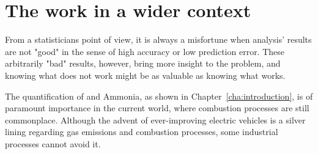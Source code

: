 \section{The work in a wider context}
\label{sec:work-wider-context}

From a statisticians point of view, it is always a misfortune when analysis' results are not "good" in the sense of high accuracy or low prediction error. These arbitrarily "bad" results, however, bring more insight to the problem, and knowing what does not work might be as valuable as knowing what works.

The quantification of \nox and Ammonia, as shown in Chapter~\ref{cha:introduction}, is of paramount importance in the current world, where combustion processes are still commonplace. Although the advent of ever-improving electric vehicles is a silver lining regarding gas emissions and combustion processes, some industrial processes cannot avoid it. 


